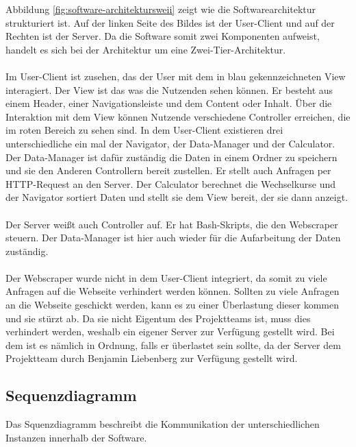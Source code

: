 \documentclass[conference]{IEEEtran}
\begin{document}
Abbildung \ref{fig:software-architektursweii} zeigt wie die Softwarearchitektur strukturiert ist. Auf der linken Seite des Bildes ist der User-Client und auf der Rechten ist der Server. Da die Software somit zwei Komponenten aufweist, handelt es sich bei der Architektur um eine Zwei-Tier-Architektur. \\\\ Im User-Client ist zusehen, das der User mit dem in blau gekennzeichneten View interagiert. Der View ist das was die Nutzenden sehen können. Er besteht aus einem Header, einer Navigationsleiste und dem Content oder Inhalt. Über die Interaktion mit dem View können Nutzende verschiedene Controller erreichen, die im roten Bereich zu sehen sind. In dem User-Client existieren drei unterschiedliche ein mal der Navigator, der Data-Manager und der Calculator. Der Data-Manager ist dafür zuständig die Daten in einem Ordner zu speichern und sie den Anderen Controllern bereit zustellen. Er stellt auch Anfragen per HTTP-Request an den Server. Der Calculator berechnet die Wechselkurse und der Navigator sortiert Daten und stellt sie dem View bereit, der sie dann anzeigt. \\\\ Der Server weißt auch Controller auf. Er hat Bash-Skripts, die den Webscraper steuern. Der Data-Manager ist hier auch wieder für die Aufarbeitung der Daten zuständig. \\\\ Der Webscraper wurde nicht in dem User-Client integriert, da somit zu viele Anfragen auf die Webseite verhindert werden können. Sollten zu viele Anfragen an die Webseite geschickt werden, kann es zu einer Überlastung dieser kommen und sie stürzt ab. Da sie nicht Eigentum des Projektteams ist, muss dies verhindert werden, weshalb ein eigener Server zur Verfügung gestellt wird. Bei dem ist es nämlich in Ordnung, falls er überlastet sein sollte, da der Server dem Projektteam durch Benjamin Liebenberg zur Verfügung gestellt wird.

\subsection{Sequenzdiagramm}
Das Squenzdiagramm beschreibt die Kommunikation der unterschiedlichen Instanzen innerhalb der Software. \newline
\end{document}
